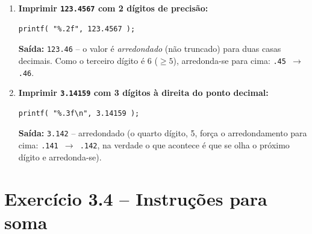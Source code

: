 \documentclass[12pt,a4paper]{article}
\begin{document}
\begin{respostabox}
\begin{enumerate}[label=\textbf{\alph*)}]
\item \textbf{Imprimir \texttt{123.4567} com 2 dígitos de precisão:}
\begin{lstlisting}
printf( "%.2f", 123.4567 );
\end{lstlisting}
\textbf{Saída:} \texttt{123.46} -- o valor é \textit{arredondado} (não truncado)
para duas casas decimais. Como o terceiro dígito é 6 ($\geq 5$), arredonda-se
para cima: \texttt{.45 \(\to\) .46}.

\item \textbf{Imprimir \texttt{3.14159} com 3 dígitos à direita do ponto decimal:}
\begin{lstlisting}
printf( "%.3f\n", 3.14159 );
\end{lstlisting}
\textbf{Saída:} \texttt{3.142} -- arredondado (o quarto dígito, 5, força o arredondamento
para cima: \texttt{.141 \(\to\) .142}, na verdade o que acontece é que se olha o próximo
dígito e arredonda-se).

\end{enumerate}
\end{respostabox}

\newpage

\section{Exercício 3.4 -- Instruções para soma}
\end{document}
